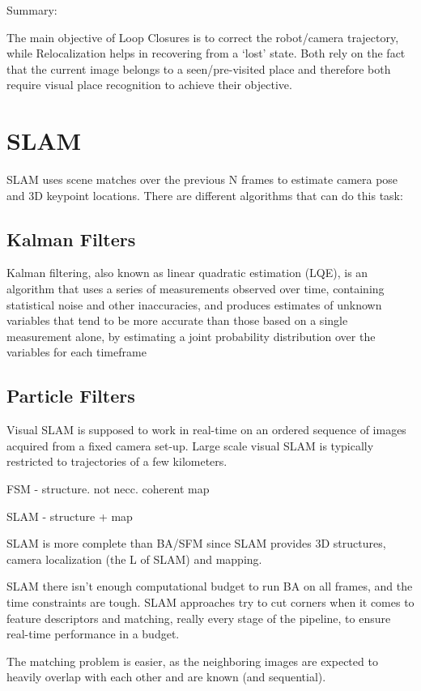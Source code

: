 Summary:

The main objective of Loop Closures is to correct the robot/camera trajectory, while Relocalization helps in recovering from a ‘lost’ state. Both rely on the fact that the current image belongs to a seen/pre-visited place and therefore both require visual place recognition to achieve their objective.


\section{SLAM}

SLAM uses scene matches over the previous N frames to estimate camera pose and 3D keypoint locations. There are different algorithms that can do this task:

\subsection{Kalman Filters}
Kalman filtering, also known as linear quadratic estimation (LQE), is an algorithm that uses a series of measurements observed over time, containing statistical noise and other inaccuracies, and produces estimates of unknown variables that tend to be more accurate than those based on a single measurement alone, by estimating a joint probability distribution over the variables for each timeframe

\subsection{Particle Filters}

Visual SLAM is supposed to work in real-time on an ordered sequence of images acquired from a fixed camera set-up. Large scale visual SLAM is typically restricted to trajectories of a few kilometers.

FSM - structure. not necc. coherent map

SLAM - structure + map

SLAM is more complete than BA/SFM since SLAM provides 3D structures, camera localization (the L of SLAM) and mapping.

SLAM there isn’t enough computational budget to run BA on all frames, and the time constraints are tough. SLAM approaches try to cut corners when it comes to feature descriptors and matching, really every stage of the pipeline, to ensure real-time performance in a budget. 

The matching problem is easier, as the  neighboring images are expected to heavily overlap with each other and are known (and sequential).

